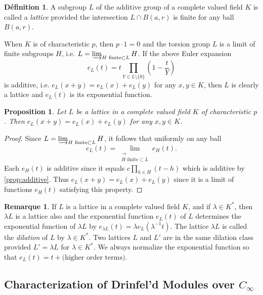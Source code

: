 \documentclass[12pt,a4paper]{article}
\theoremstyle{plain}
\newtheorem{proposition}{Proposition}[section]
\theoremstyle{definition}
\newtheorem{definition}{D\'efinition}[section]
\newtheorem{remark}{Remarque}[section]
\theoremstyle{remark}
\begin{document}
\begin{definition}
\label{def:lattice}
A subgroup $L$ of the additive group of a complete valued field $K$ is called a \emph{lattice} provided the intersection $L \cap B(a, r)$ is finite for any ball $B(a, r)$.
\end{definition}

When $K$ is of characteristic $p$, then $p \cdot 1 = 0$ and the torsion group $L$ is a limit of finite subgroups $H$, i.e. $L = \varinjlim_{H \text{ finite} \subset L} H$. If the above Euler expansion
\[
e_L(t) = t \prod_{Y \in L \setminus \{0\}} \left(1 - \frac{t}{Y}\right)
\]
is additive, i.e. $e_L(x+y) = e_L(x) + e_L(y)$ for any $x, y \in K$, then $L$ is clearly a lattice and $e_L(t)$ is its exponential function.

\begin{proposition}
\label{prop:additive}
Let $L$ be a lattice in a complete valued field $K$ of characteristic $p$. Then $e_L(x+y) = e_L(x) + e_L(y)$ for any $x, y \in K$.
\end{proposition}

\begin{proof}
Since $L = \varinjlim_{H \text{ finite} \subset L} H$, it follows that uniformly on any ball
\[
e_L(t) = \lim_{\substack{\longrightarrow \\ H \text{ finite} \subset L}} e_H(t).
\]
Each $e_H(t)$ is additive since it equals $c \prod_{h \in H} (t - h)$ which is additive by \eqref{prop:additive}. Thus $e_L(x+y) = e_L(x) + e_L(y)$ since it is a limit of functions $e_H(t)$ satisfying this property.
\end{proof}

\begin{remark}
\label{rem:dilation}
If $L$ is a lattice in a complete valued field $K$, and if $\lambda \in K^*$, then $\lambda L$ is a lattice also and the exponential function $e_L(t)$ of $L$ determines the exponential function of $\lambda L$ by $e_{\lambda L}(t) = \lambda e_L(\lambda^{-1} t)$. The lattice $\lambda L$ is called the \emph{dilation} of $L$ by $\lambda \in K^*$. Two lattices $L$ and $L'$ are in the same dilation class provided $L' = \lambda L$ for $\lambda \in K^*$. We always normalize the exponential function so that $e_L(t) = t + \text{(higher order terms)}$.
\end{remark}

\subsection{Characterization of Drinfel'd Modules over $C_\infty$}
\label{sec:characterization}
\end{document}
